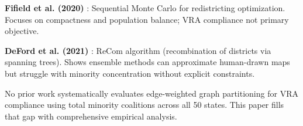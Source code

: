 \textbf{Fifield et al. (2020)} \citep{fifield2020}: Sequential Monte Carlo for redistricting optimization. Focuses on compactness and population balance; VRA compliance not primary objective.

\textbf{DeFord et al. (2021)} \citep{deford2021}: ReCom algorithm (recombination of districts via spanning trees). Shows ensemble methods can approximate human-drawn maps but struggle with minority concentration without explicit constraints.

No prior work systematically evaluates edge-weighted graph partitioning for VRA compliance using total minority coalitions across all 50 states. This paper fills that gap with comprehensive empirical analysis.
